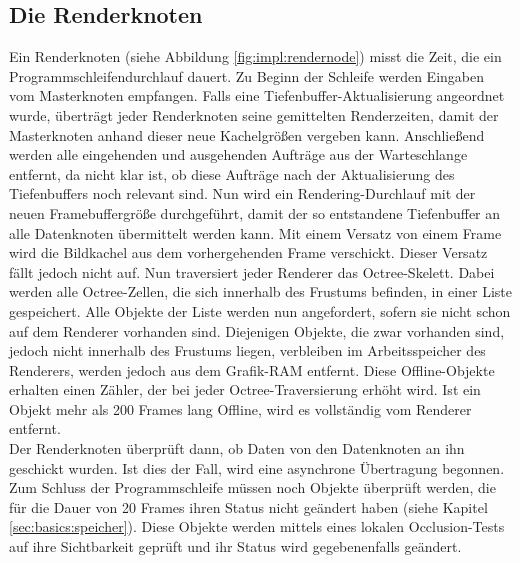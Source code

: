 \subsection{Die Renderknoten}
\label{sec:impl:render}
Ein Renderknoten (siehe Abbildung \ref{fig:impl:rendernode}) misst die Zeit, die ein Programmschleifendurchlauf dauert. Zu Beginn der Schleife werden Eingaben vom Masterknoten empfangen. Falls eine Tiefenbuffer-Aktualisierung angeordnet wurde, überträgt jeder Renderknoten seine gemittelten Renderzeiten, damit der Masterknoten anhand dieser neue Kachelgrößen vergeben kann. Anschließend werden alle eingehenden und ausgehenden Aufträge aus der Warteschlange entfernt, da nicht klar ist, ob diese Aufträge nach der Aktualisierung des Tiefenbuffers noch relevant sind. Nun wird ein Rendering-Durchlauf mit der neuen Framebuffergröße durchgeführt, damit der so entstandene Tiefenbuffer an alle Datenknoten übermittelt werden kann. Mit einem Versatz von einem Frame wird die Bildkachel aus dem vorhergehenden Frame verschickt. Dieser Versatz fällt jedoch nicht auf. Nun traversiert jeder Renderer das Octree-Skelett. Dabei werden alle Octree-Zellen, die sich innerhalb des Frustums befinden, in einer Liste gespeichert. Alle Objekte der Liste werden nun angefordert, sofern sie nicht schon auf dem Renderer vorhanden sind. Diejenigen Objekte, die zwar vorhanden sind, jedoch nicht innerhalb des Frustums liegen, verbleiben im Arbeitsspeicher des Renderers, werden jedoch aus dem Grafik-RAM entfernt. Diese Offline-Objekte erhalten einen Zähler, der bei jeder Octree-Traversierung erhöht wird. Ist ein Objekt mehr als 200 Frames lang Offline, wird es vollständig vom Renderer entfernt.\\
Der Renderknoten überprüft dann, ob Daten von den Datenknoten an ihn geschickt wurden. Ist dies der Fall, wird eine asynchrone Übertragung begonnen. Zum Schluss der Programmschleife müssen noch Objekte überprüft werden, die für die Dauer von 20 Frames ihren Status nicht geändert haben (siehe Kapitel \ref{sec:basics:speicher}). Diese Objekte werden mittels eines lokalen Occlusion-Tests auf ihre Sichtbarkeit geprüft und ihr Status wird gegebenenfalls geändert.
 
